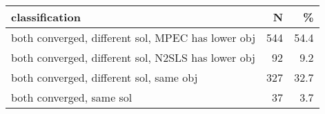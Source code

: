\begin{table}
\centering
\begin{tabular}[t]{lrr}
\toprule
classification & N & \%\\
\midrule
both converged, different sol, MPEC has lower obj & 544 & 54.4\\
both converged, different sol, N2SLS has lower obj & 92 & 9.2\\
both converged, different sol, same obj & 327 & 32.7\\
both converged, same sol & 37 & 3.7\\
\bottomrule
\end{tabular}
\end{table}
